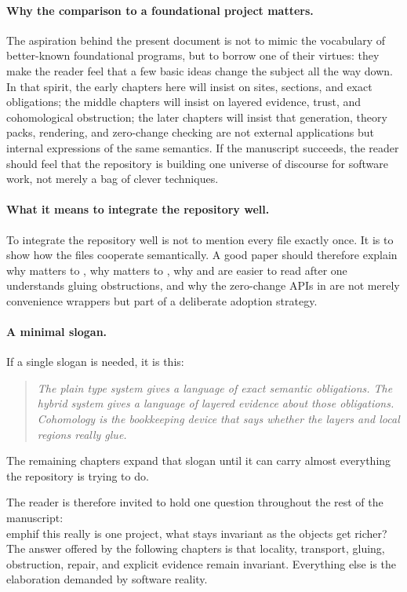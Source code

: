 \paragraph{Why the comparison to a foundational project matters.}
The aspiration behind the present document is not to mimic the vocabulary of better-known
foundational programs, but to borrow one of their virtues: they make the reader feel that a
few basic ideas change the subject all the way down. In that spirit, the early chapters here
will insist on sites, sections, and exact obligations; the middle chapters will insist on
layered evidence, trust, and cohomological obstruction; the later chapters will insist that
generation, theory packs, rendering, and zero-change checking are not external applications
but internal expressions of the same semantics. If the manuscript succeeds, the reader
should feel that the repository is building one universe of discourse for software work, not
merely a bag of clever techniques.

\paragraph{What it means to integrate the repository well.}
To integrate the repository well is not to mention every file exactly once. It is to show
how the files cooperate semantically. A good paper should therefore explain why
 matters to ,
why  matters to , why
 and  are easier to read after one
understands gluing obstructions, and why the zero-change APIs in  are
not merely convenience wrappers but part of a deliberate adoption strategy.

\paragraph{A minimal slogan.}
If a single slogan is needed, it is this:
\begin{quote}
\emph{The plain type system gives \DepPy{} a language of exact semantic obligations.
The hybrid system gives \DepPy{} a language of layered evidence about those obligations.
Cohomology is the bookkeeping device that says whether the layers and local regions really
glue.}
\end{quote}

The remaining chapters expand that slogan until it can carry almost everything the
repository is trying to do.

The reader is therefore invited to hold one question throughout the rest of the manuscript:
\\emph{if this really is one project, what stays invariant as the objects get richer?} The
answer offered by the following chapters is that locality, transport, gluing, obstruction,
repair, and explicit evidence remain invariant. Everything else is the elaboration demanded
by software reality.
